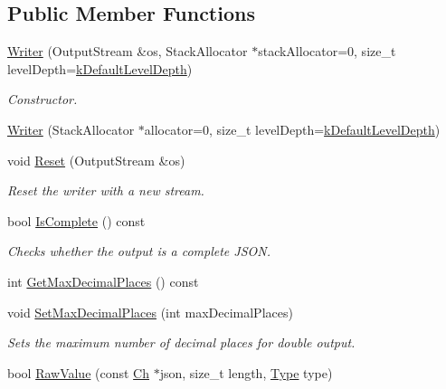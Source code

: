 \subsection*{Public Member Functions}
\begin{DoxyCompactItemize}
\item 
\mbox{\hyperlink{classrapidjson_1_1_writer_a98a421c806b456688874511f64add1f2}{Writer}} (Output\+Stream \&os, Stack\+Allocator $\ast$stack\+Allocator=0, size\+\_\+t level\+Depth=\mbox{\hyperlink{classrapidjson_1_1_writer_a9acc453af3bfddea0bf001e022ae411c}{k\+Default\+Level\+Depth}})
\begin{DoxyCompactList}\small\item\em Constructor. \end{DoxyCompactList}\item 
\mbox{\hyperlink{classrapidjson_1_1_writer_a2e78f43b2395d7ecb0d9a284659d59fb}{Writer}} (Stack\+Allocator $\ast$allocator=0, size\+\_\+t level\+Depth=\mbox{\hyperlink{classrapidjson_1_1_writer_a9acc453af3bfddea0bf001e022ae411c}{k\+Default\+Level\+Depth}})
\item 
void \mbox{\hyperlink{classrapidjson_1_1_writer_ac4026d3f14b80d6d7fc10004b1972722}{Reset}} (Output\+Stream \&os)
\begin{DoxyCompactList}\small\item\em Reset the writer with a new stream. \end{DoxyCompactList}\item 
bool \mbox{\hyperlink{classrapidjson_1_1_writer_a190d964d3e62155e87153e858a0b04da}{Is\+Complete}} () const
\begin{DoxyCompactList}\small\item\em Checks whether the output is a complete J\+S\+ON. \end{DoxyCompactList}\item 
int \mbox{\hyperlink{classrapidjson_1_1_writer_aa436d23d8227c270a9a5297a6dbc0674}{Get\+Max\+Decimal\+Places}} () const
\item 
void \mbox{\hyperlink{classrapidjson_1_1_writer_aa7b6967dc237519e2a6d8b3939fb9634}{Set\+Max\+Decimal\+Places}} (int max\+Decimal\+Places)
\begin{DoxyCompactList}\small\item\em Sets the maximum number of decimal places for double output. \end{DoxyCompactList}\item 
bool \mbox{\hyperlink{classrapidjson_1_1_writer_a8acb89b2bbb1e5f384e6076b65044dbe}{Raw\+Value}} (const \mbox{\hyperlink{classrapidjson_1_1_writer_a2cf973937ca1110293bf1350fac2a6d6}{Ch}} $\ast$json, size\+\_\+t length, \mbox{\hyperlink{namespacerapidjson_ae79a4751c1c460ff0de5ecc07874f3e4}{Type}} type)

\end{DoxyCompactItemize}
